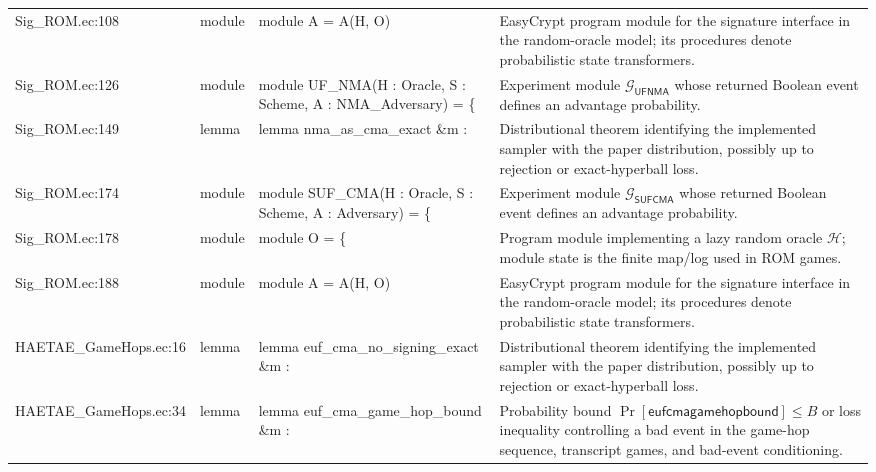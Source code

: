\documentclass[10pt]{article}
\begin{document}
\begin{longtable}{L{0.11\textwidth}L{0.055\textwidth}L{0.385\textwidth}L{0.41\textwidth}}
Sig\_\allowbreak{}ROM.\allowbreak{}ec:\allowbreak{}108 & module & {\ttfamily\scriptsize module A = A(H, O)} & EasyCrypt program module for the signature interface in the random-oracle model; its procedures denote probabilistic state transformers. \\
Sig\_\allowbreak{}ROM.\allowbreak{}ec:\allowbreak{}126 & module & {\ttfamily\scriptsize module UF\_\allowbreak{}NMA(H : Oracle, S : Scheme, A : NMA\_\allowbreak{}Adversary) = \{} & Experiment module $\mathcal G_{\mathsf{UFNMA}}$ whose returned Boolean event defines an advantage probability. \\
Sig\_\allowbreak{}ROM.\allowbreak{}ec:\allowbreak{}149 & lemma & {\ttfamily\scriptsize lemma nma\_\allowbreak{}as\_\allowbreak{}cma\_\allowbreak{}exact \&m :} & Distributional theorem identifying the implemented sampler with the paper distribution, possibly up to rejection or exact-hyperball loss. \\
Sig\_\allowbreak{}ROM.\allowbreak{}ec:\allowbreak{}174 & module & {\ttfamily\scriptsize module SUF\_\allowbreak{}CMA(H : Oracle, S : Scheme, A : Adversary) = \{} & Experiment module $\mathcal G_{\mathsf{SUFCMA}}$ whose returned Boolean event defines an advantage probability. \\
Sig\_\allowbreak{}ROM.\allowbreak{}ec:\allowbreak{}178 & module & {\ttfamily\scriptsize module O = \{} & Program module implementing a lazy random oracle $\mathcal H$; module state is the finite map/log used in ROM games. \\
Sig\_\allowbreak{}ROM.\allowbreak{}ec:\allowbreak{}188 & module & {\ttfamily\scriptsize module A = A(H, O)} & EasyCrypt program module for the signature interface in the random-oracle model; its procedures denote probabilistic state transformers. \\
HAETAE\_\allowbreak{}GameHops.\allowbreak{}ec:\allowbreak{}16 & lemma & {\ttfamily\scriptsize lemma euf\_\allowbreak{}cma\_\allowbreak{}no\_\allowbreak{}signing\_\allowbreak{}exact \&m :} & Distributional theorem identifying the implemented sampler with the paper distribution, possibly up to rejection or exact-hyperball loss. \\
HAETAE\_\allowbreak{}GameHops.\allowbreak{}ec:\allowbreak{}34 & lemma & {\ttfamily\scriptsize lemma euf\_\allowbreak{}cma\_\allowbreak{}game\_\allowbreak{}hop\_\allowbreak{}bound \&m :} & Probability bound $\Pr[\mathsf{eufcmagamehopbound}]\le B$ or loss inequality controlling a bad event in the game-hop sequence, transcript games, and bad-event conditioning. \\

\end{longtable}
\end{document}
